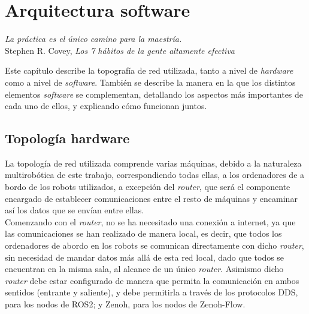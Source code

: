 \chapter{Arquitectura software}
\label{cap:capitulo4}

\begin{flushright}
\emph{La práctica es el único camino para la maestría.}\\

Stephen R. Covey, \textit{Los 7 hábitos de la gente altamente efectiva}\\
\end{flushright}

\vspace{1cm}


Este capítulo describe la topografía de red utilizada, tanto a nivel de
\textit{hardware} como a nivel de \textit{software}.
También se describe la manera en la que los distintos elementos
\textit{software} se complementan, detallando los aspectos más importantes de
cada uno de ellos, y explicando cómo funcionan juntos.



\section{Topología hardware}
\label{sec:topologia_hw}

La topología de red utilizada comprende varias máquinas, debido a la naturaleza
multirobótica de este trabajo, correspondiendo todas ellas, a los ordenadores de
a bordo de los robots utilizados, a excepción del \textit{router}, que será el
componente encargado de establecer comunicaciones entre el resto de máquinas y
encaminar así los datos que se envían entre ellas.
\\

Comenzando con el \textit{router}, no se ha necesitado una conexión a internet,
ya que las comunicaciones se han realizado de manera local, es decir, que todos
los ordenadores de abordo en los robots se comunican directamente con dicho
\textit{router}, sin necesidad de mandar datos más allá de esta red local,
dado que todos se encuentran en la misma sala, al alcance de un único
\textit{router}.
Asimismo dicho \textit{router} debe estar configurado de manera que permita la
comunicación en ambos sentidos (entrante y saliente), y debe permitirla a través
de los protocolos DDS, para los nodos de ROS2; y Zenoh, para los nodos de
Zenoh-Flow.
\\

